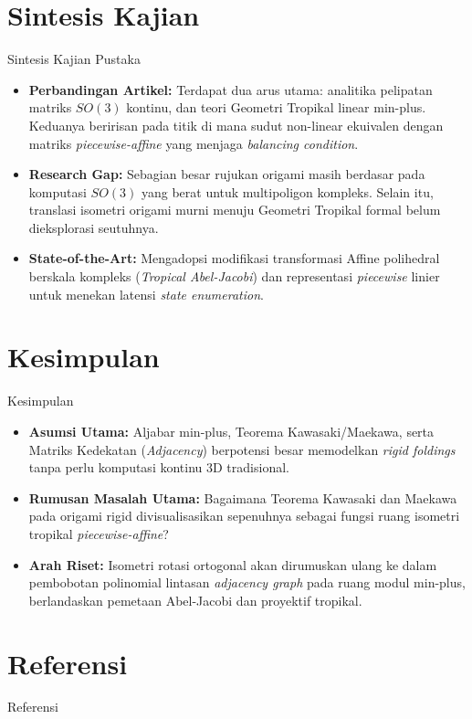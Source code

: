 \documentclass[aspectratio=169]{beamer}
\begin{document}
\section{Sintesis Kajian}
\begin{frame}{Sintesis Kajian Pustaka}
  \begin{itemize}
    \item \textbf{Perbandingan Artikel:} Terdapat dua arus utama: analitika pelipatan matriks $SO(3)$ kontinu, dan teori Geometri Tropikal linear min-plus. Keduanya beririsan pada titik di mana sudut non-linear ekuivalen dengan matriks \textit{piecewise-affine} yang menjaga \textit{balancing condition}.
    \item \textbf{Research Gap:} Sebagian besar rujukan origami masih berdasar pada komputasi $SO(3)$ yang berat untuk multipoligon kompleks. Selain itu, translasi isometri origami murni menuju Geometri Tropikal formal belum dieksplorasi seutuhnya.
    \item \textbf{State-of-the-Art:} Mengadopsi modifikasi transformasi Affine polihedral berskala kompleks (\textit{Tropical Abel-Jacobi}) dan representasi \textit{piecewise} linier untuk menekan latensi \textit{state enumeration}.
  \end{itemize}
\end{frame}

\section{Kesimpulan}
\begin{frame}{Kesimpulan}
  \begin{itemize}
    \item \textbf{Asumsi Utama:} Aljabar min-plus, Teorema Kawasaki/Maekawa, serta Matriks Kedekatan (\textit{Adjacency}) berpotensi besar memodelkan \textit{rigid foldings} tanpa perlu komputasi kontinu 3D tradisional.
    \item \textbf{Rumusan Masalah Utama:} Bagaimana Teorema Kawasaki dan Maekawa pada origami rigid divisualisasikan sepenuhnya sebagai fungsi ruang isometri tropikal \textit{piecewise-affine}?
    \item \textbf{Arah Riset:} Isometri rotasi ortogonal akan dirumuskan ulang ke dalam pembobotan polinomial lintasan \textit{adjacency graph} pada ruang modul min-plus, berlandaskan pemetaan Abel-Jacobi dan proyektif tropikal.
  \end{itemize}
\end{frame}

\section{Referensi}
\begin{frame}[allowframebreaks]{Referensi}
  \printbibliography
\end{frame}
\end{document}

